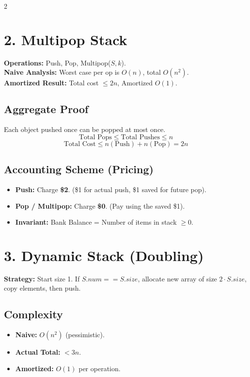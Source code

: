 \documentclass[10pt, a4paper]{article}
\begin{document}
\begin{multicols*}{2}
\section{2. Multipop Stack}
\textbf{Operations:} Push, Pop, Multipop($S, k$).\\
\textbf{Naive Analysis:} Worst case per op is $O(n)$, total $O(n^2)$.\\
\textbf{Amortized Result:} Total cost $\le 2n$, Amortized $O(1)$.

\subsection*{Aggregate Proof}
Each object pushed once can be popped at most once.
\[ \text{Total Pops} \le \text{Total Pushes} \le n \]
\[ \text{Total Cost} \le n (\text{Push}) + n (\text{Pop}) = 2n \]

\subsection*{Accounting Scheme (Pricing)}
\begin{itemize}
    \item \textbf{Push:} Charge \textbf{\$2}. (\$1 for actual push, \$1 saved for future pop).
    \item \textbf{Pop / Multipop:} Charge \textbf{\$0}. (Pay using the saved \$1).
    \item \textbf{Invariant:} Bank Balance = Number of items in stack $\ge 0$.
\end{itemize}

\section{3. Dynamic Stack (Doubling)}
\textbf{Strategy:} Start size 1. If $S.num == S.size$, allocate new array of size $2 \cdot S.size$, copy elements, then push.

\subsection*{Complexity}
\begin{itemize}
    \item \textbf{Naive:} $O(n^2)$ (pessimistic).
    \item \textbf{Actual Total:} $< 3n$.
    \item \textbf{Amortized:} $O(1)$ per operation.
\end{itemize}


\end{multicols*}
\end{document}
